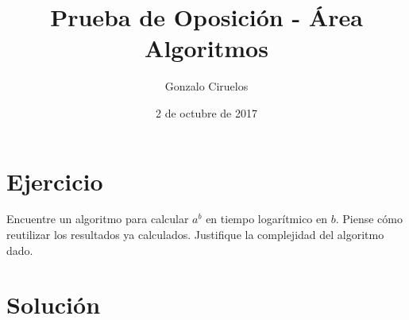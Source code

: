 \documentclass[hidelinks,a4paper,10pt, nofootinbib]{article}
\title{Prueba de Oposición - Área Algoritmos}
\author{Gonzalo Ciruelos}
\date{2 de octubre de 2017}
\begin{document}
\maketitle

\section*{Ejercicio}

Encuentre un algoritmo para calcular $a^b$ en tiempo logarítmico en $b$.
Piense cómo reutilizar los resultados ya calculados.
Justifique la complejidad del algoritmo dado.
\section*{Solución}
\end{document}
